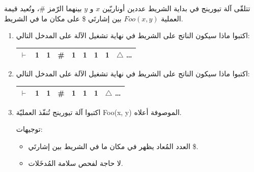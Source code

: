 \documentclass[14pt]{extarticle}
\begin{document}
\begin{enumerate}[label=\arabic*., start=4]
تتلقّى آلة تيورينج في بداية الشريط عددين أوناريّين $x$ و $y$ بينهما الرّمز \#،
وتُعيد قيمة العملية $Foo(x, y)$ بين إشارتَي \$ على مكان ما في الشريط.

\begin{enumerate}

\item[أ.] اكتبوا ماذا سيكون الناتج على الشريط في نهاية تشغيل الآلة على المدخل التالي:

\begin{center}
\begin{english}
\begin{tabular}{|c|c|c|c|c|c|c|c|c|}
\hline
$\vdash$ & 1 & 1 & \# & 1 & 1 & 1 & 1 & $\triangle$ \ldots \\
\hline
\end{tabular}
\end{english}
\end{center}

\item[ب.] اكتبوا ماذا سيكون الناتج على الشريط في نهاية تشغيل الآلة على المدخل التالي:

\begin{center}
\begin{english}
\begin{tabular}{|c|c|c|c|c|c|c|c|}
\hline
$\vdash$ & 1 & 1 & \# & 1 & 1 & 1 & $\triangle$ \ldots \\
\hline
\end{tabular}
\end{english}
\end{center}

\item[ج.] اكتبوا آلة تيورينج تُنفّذ العمليّة \textenglish{Foo(x, y)} الموصوفة أعلاه.

توجيهات:
\begin{itemize}
    \item العدد المُعاد يظهر في مكان ما في الشريط بين إشارتَي \$.
    \item لا حاجة لفحص سلامة المُدخَلات.
\end{itemize}

\end{enumerate}
\end{enumerate}
\end{document}
